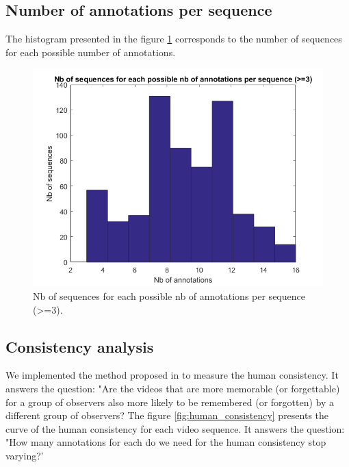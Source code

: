 \documentclass[sigconf]{acmart}
\begin{document}
\subsection{Number of annotations per sequence}
The histogram presented in the figure \ref{fig:nb_annotations_per_sequence} corresponds to the number of sequences for each possible number of annotations.

\begin{figure}[!htbp]
	\centering
	\includegraphics[width=\columnwidth]{figures/histogram_nb_sequences_for_nb_of_annotations.png}
	\caption{\label{fig:nb_annotations_per_sequence}Nb of sequences for each possible nb of annotations per sequence (>=3).}
\end{figure}


\subsection{Consistency analysis}
We implemented the method proposed in \cite{isola_2014_makes} to measure the human consistency. It answers the question: "Are the videos that are more memorable (or forgettable) for a group of observers also more likely to be remembered (or forgotten) by a different group of observers? The figure \ref{fig:human_consistency} presents the curve of the human consistency for each video sequence. It answers the question: "How many annotations for each do we need for the human consistency stop varying?'
\end{document}
